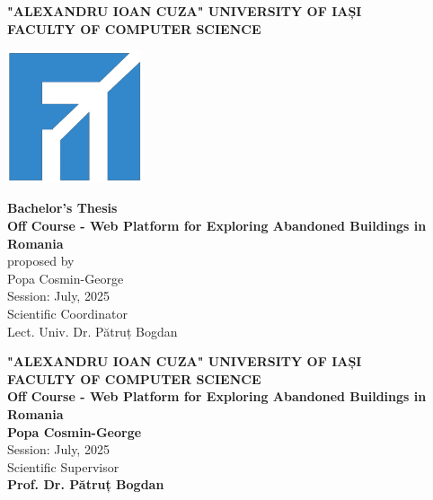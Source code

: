 \documentclass[12pt,a4paper]{report}
\begin{document}
\begin{titlepage}
    \centering
    {\Large \textbf{"ALEXANDRU IOAN CUZA" UNIVERSITY OF IAȘI}}\\[0.5cm]
    {\Large \textbf{FACULTY OF COMPUTER SCIENCE}}\\[2cm]
    
    \begin{center}
    \includegraphics[width=0.3\textwidth]{images/logoFii.png}
    \end{center}

    {\Huge \textbf{Bachelor's Thesis}}\\[1cm]
    {\Huge \textbf{Off Course - Web Platform for Exploring Abandoned Buildings in Romania}}\\[3cm]

    {\Large proposed by}\\[1cm]

    {\Large Popa Cosmin-George}\\[2cm]
    
    {\large Session: July, 2025}\\[1cm]
    
    {\large Scientific Coordinator}\\
    {\large Lect. Univ. Dr. Pătruț Bogdan}\\[2cm]
    
    \vfill
\end{titlepage}

\newpage
\begin{center}
{\Large \textbf{"ALEXANDRU IOAN CUZA" UNIVERSITY OF IAȘI}}\\[0.5cm]
{\Large \textbf{FACULTY OF COMPUTER SCIENCE}}\\[3cm]

{\Large \textbf{Off Course - Web Platform for Exploring Abandoned Buildings in Romania}}\\[3cm]

{\Large \textbf{Popa Cosmin-George}}\\[2cm]

{\large Session: July, 2025}\\[2cm]

{\large Scientific Supervisor}\\
{\large \textbf{Prof. Dr. Pătruț Bogdan}}\\[2cm]
\end{center}
\end{document}
